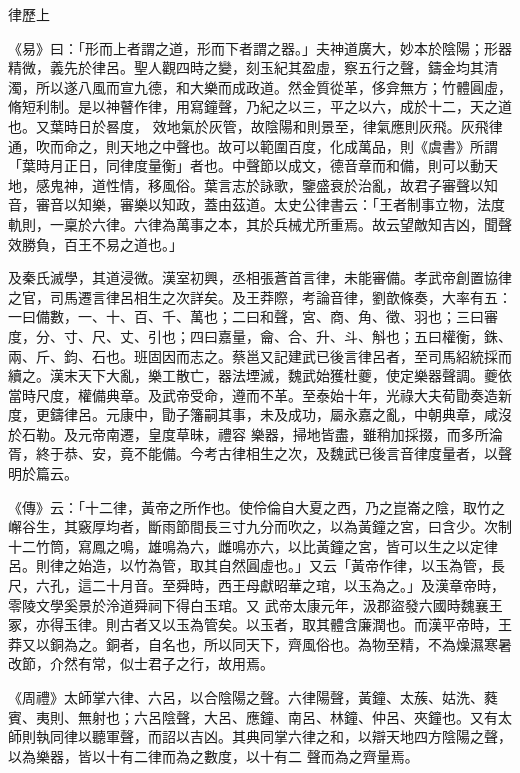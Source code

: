 
\begin{pinyinscope}

 律歷上



 《易》曰：「形而上者謂之道，形而下者謂之器。」夫神道廣大，妙本於陰陽；形器精微，義先於律呂。聖人觀四時之變，刻玉紀其盈虛，察五行之聲，鑄金均其清濁，所以遂八風而宣九德，和大樂而成政道。然金質從革，侈弇無方；竹體圓虛，脩短利制。是以神瞽作律，用寫鐘聲，乃紀之以三，平之以六，成於十二，天之道也。又葉時日於晷度，
 效地氣於灰管，故陰陽和則景至，律氣應則灰飛。灰飛律通，吹而命之，則天地之中聲也。故可以範圍百度，化成萬品，則《虞書》所謂「葉時月正日，同律度量衡」者也。中聲節以成文，德音章而和備，則可以動天地，感鬼神，道性情，移風俗。葉言志於詠歌，鑒盛衰於治亂，故君子審聲以知音，審音以知樂，審樂以知政，蓋由茲道。太史公律書云：「王者制事立物，法度軌則，一稟於六律。六律為萬事之本，其於兵械尤所重焉。故云望敵知吉凶，聞聲效勝負，百王不易之道也。」



 及秦氏滅學，其道浸微。漢室初興，丞相張蒼首言律，未能審備。孝武帝創置協律
 之官，司馬遷言律呂相生之次詳矣。及王莽際，考論音律，劉歆條奏，大率有五：一曰備數，一、十、百、千、萬也；二曰和聲，宮、商、角、徵、羽也；三曰審度，分、寸、尺、丈、引也；四曰嘉量，龠、合、升、斗、斛也；五曰權衡，銖、兩、斤、鈞、石也。班固因而志之。蔡邕又記建武已後言律呂者，至司馬紹統採而續之。漢末天下大亂，樂工散亡，器法堙滅，魏武始獲杜夔，使定樂器聲調。夔依當時尺度，權備典章。及武帝受命，遵而不革。至泰始十年，光祿大夫荀勖奏造新度，更鑄律呂。元康中，勖子籓嗣其事，未及成功，屬永嘉之亂，中朝典章，咸沒於石勒。及元帝南遷，皇度草昧，禮容
 樂器，掃地皆盡，雖稍加採掇，而多所淪胥，終于恭、安，竟不能備。今考古律相生之次，及魏武已後言音律度量者，以聲明於篇云。



 《傳》云：「十二律，黃帝之所作也。使伶倫自大夏之西，乃之崑崙之陰，取竹之嶰谷生，其竅厚均者，斷雨節間長三寸九分而吹之，以為黃鐘之宮，曰含少。次制十二竹筒，寫鳳之鳴，雄鳴為六，雌鳴亦六，以比黃鐘之宮，皆可以生之以定律呂。則律之始造，以竹為管，取其自然圓虛也。」又云「黃帝作律，以玉為管，長尺，六孔，這二十月音。至舜時，西王母獻昭華之琯，以玉為之。」及漢章帝時，零陵文學奚景於泠道舜祠下得白玉琯。又
 武帝太康元年，汲郡盜發六國時魏襄王冢，亦得玉律。則古者又以玉為管矣。以玉者，取其體含廉潤也。而漢平帝時，王莽又以銅為之。銅者，自名也，所以同天下，齊風俗也。為物至精，不為燥濕寒暑改節，介然有常，似士君子之行，故用焉。



 《周禮》太師掌六律、六呂，以合陰陽之聲。六律陽聲，黃鐘、太蔟、姑洗、蕤賓、夷則、無射也；六呂陰聲，大呂、應鐘、南呂、林鐘、仲呂、夾鐘也。又有太師則執同律以聽軍聲，而詔以吉凶。其典同掌六律之和，以辯天地四方陰陽之聲，以為樂器，皆以十有二律而為之數度，以十有二
 聲而為之齊量焉。




\end{pinyinscope}
